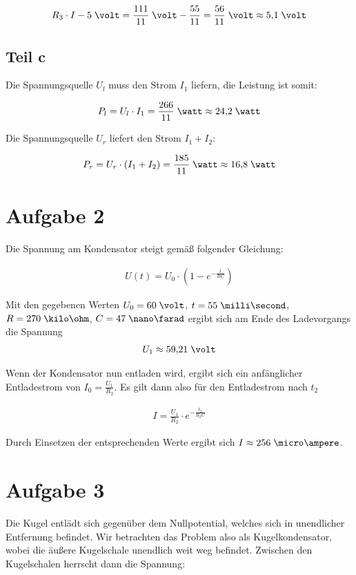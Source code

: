\documentclass[a4paper,german,12pt,smallheadings]{scrartcl}
\begin{document}
\begin{align*}
  R_3 \cdot I - 5\;\volt = \frac{111}{11}\;\volt - \frac{55}{11} = \frac{56}{11}\;\volt \approx 5{,}1\;\volt
\end{align*}

\subsection*{Teil c}
Die Spannungsquelle $U_l$ muss den Strom $I_1$ liefern, die Leistung ist somit:

\begin{align*}
  P_l = U_l \cdot I_1 = \frac{266}{11} \;\watt \approx 24{,}2\;\watt
\end{align*}

Die Spannungsquelle $U_r$ liefert den Strom $I_1 + I_2$:

\begin{align*}
  P_r = U_r \cdot (I_1 + I_2) = \frac{185}{11} \;\watt \approx 16{,}8\;\watt
\end{align*}

\section*{Aufgabe 2}
Die Spannung am Kondensator steigt gemäß folgender Gleichung:

\begin{align*}
  U(t) = U_0 \cdot (1 - e^{-\frac{t}{RC}})
\end{align*}

Mit den gegebenen Werten $U_0 = 60\;\volt$, $t = 55\;\milli\second$, $R = 270\;\kilo\ohm$, $C = 47\;\nano\farad$ ergibt sich am Ende des Ladevorgangs die Spannung
\begin{align*}
  U_1 \approx 59{,}21 \;\volt
\end{align*}

Wenn der Kondensator nun entladen wird, ergibt sich ein anfänglicher
Entladestrom von $I_0 = \frac{U_1}{R_2}$. Es gilt dann also für den
Entladestrom nach $t_2$

\begin{align*}
  I = \frac{U_1}{R_2} \cdot e^{-\frac{t_2}{R_2C}}
\end{align*}

Durch Einsetzen der entsprechenden Werte ergibt sich $I \approx 256\;\micro\ampere$.

\section*{Aufgabe 3}
Die Kugel entlädt sich gegenüber dem Nullpotential, welches sich in unendlicher
Entfernung befindet. Wir betrachten das Problem also als Kugelkondensator,
wobei die äußere Kugelschale unendlich weit weg befindet. Zwischen den
Kugelschalen herrscht dann die Spannung:
\end{document}
